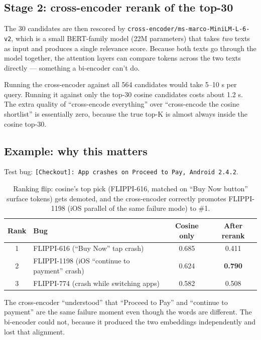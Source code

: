 \documentclass[11pt,a4paper]{article}
\begin{document}
\subsection{Stage 2: cross-encoder rerank of the top-30}

The 30 candidates are then rescored by
\texttt{cross-encoder/ms-marco-MiniLM-L-6-v2}, which is a small BERT-family
model (22M parameters) that takes \emph{two} texts as input and produces a
single relevance score. Because both texts go through the model together,
the attention layers can compare tokens across the two texts directly
--- something a bi-encoder can't do.

\begin{decisionbox}
Running the cross-encoder against all 564 candidates would take 5--10 s
per query. Running it against only the top-30 cosine candidates costs
about 1.2 s. The extra quality of ``cross-encode everything'' over
``cross-encode the cosine shortlist'' is essentially zero, because the
true top-K is almost always inside the cosine top-30.
\end{decisionbox}

\subsection{Example: why this matters}

Test bug: \texttt{[Checkout]: App crashes on Proceed to Pay, Android 2.4.2}.

\begin{table}[h]
\centering
\footnotesize
\begin{tabular}{clcc}
\toprule
\textbf{Rank} & \textbf{Bug} & \textbf{Cosine only} & \textbf{After rerank} \\
\midrule
1 & FLIPPI-616 (``Buy Now'' tap crash) & 0.685 & 0.411 \\
2 & FLIPPI-1198 (iOS ``continue to payment'' crash) & 0.624 & \textbf{0.790} \\
3 & FLIPPI-774 (crash while switching apps) & 0.582 & 0.508 \\
\bottomrule
\end{tabular}
\caption{Ranking flip: cosine's top pick (FLIPPI-616, matched on ``Buy Now button'' surface tokens) gets demoted, and the cross-encoder correctly promotes FLIPPI-1198 (iOS parallel of the same failure mode) to \#1.}
\end{table}

The cross-encoder ``understood'' that ``Proceed to Pay'' and ``continue to
payment'' are the same failure moment even though the words are different.
The bi-encoder could not, because it produced the two embeddings
independently and lost that alignment.
\end{document}
